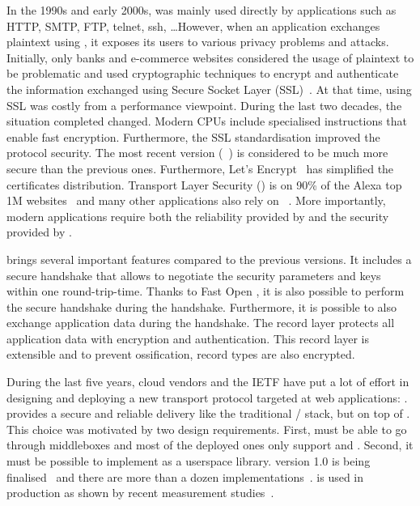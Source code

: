 In the 1990s and early 2000s, \tcp was mainly used directly by applications such as HTTP, SMTP, FTP, telnet, ssh, \ldots However, when an application exchanges plaintext using \tcp, it exposes its users to various privacy problems and attacks. Initially, only banks and e-commerce websites considered the usage of plaintext to be problematic and used cryptographic techniques to encrypt and authenticate the information exchanged using Secure Socket Layer (SSL)~\cite{draft-hickman-netscape-ssl}. At that time, using SSL was costly from a performance viewpoint. During the last two decades, the situation completed changed. Modern CPUs include specialised instructions that enable fast encryption. Furthermore, the SSL standardisation improved the protocol security. The most recent version (~\cite{rfc8446}) is considered to be much more secure than the previous ones. Furthermore, Let's Encrypt~\cite{aas2019let} has simplified the certificates distribution. Transport Layer Security (\tls) is on 90\% of the Alexa top 1M websites~\cite{holz2019era,holz2020tracking} and many other applications also
rely on \tls~\cite{anderson2019tls}. More importantly, modern applications
require both the reliability provided by \tcp and the security provided
by \tls.

 brings several important features compared to the previous versions. It includes a secure handshake that allows to negotiate the security parameters and keys within one round-trip-time. Thanks to \tcp Fast Open \cite{radhakrishnan2011tcp}, it is also possible to perform the secure handshake during the \tcp handshake. Furthermore, it is possible to also exchange application data during the handshake. The  record layer protects all application data with encryption and authentication. This record layer is extensible and to prevent ossification, \tls record types are also encrypted.





During the last five years, cloud vendors and the IETF have put a lot
of effort in designing and deploying a new transport protocol targeted
at web applications: \quic \cite{10.1145/3098822.3098842}. \quic
provides a secure and reliable delivery like the traditional \tls/\tcp
stack, but on top of \udp. This choice was motivated by two design
requirements. First, \quic must be able to go through middleboxes and most
of the deployed ones only support \tcp and \udp. Second, it must be
possible to implement \quic as a userspace library. \quic version 1.0 is being finalised~\cite{draft-ietf-quic-transport} and there are more than a dozen implementations~\cite{quicimplem,marx2020same}. \quic is used in
production as shown by recent measurement studies~\cite{trevisan2020five}.

